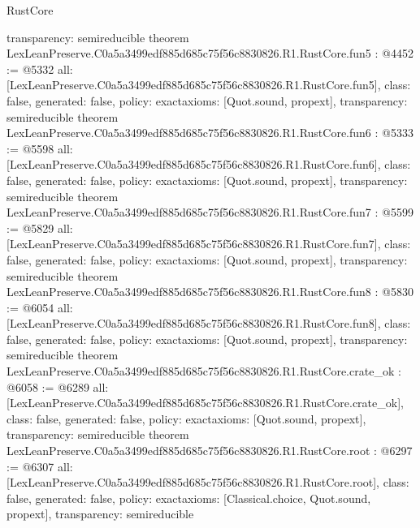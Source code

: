 \begin{lexlean}{RustCore}
\begin{coremodule}
{  transparency: semireducible
}
theorem LexLeanPreserve.C0a5a3499edf885d685c75f56c8830826.R1.RustCore.fun5 : @4452 := @5332 {
  all: [LexLeanPreserve.C0a5a3499edf885d685c75f56c8830826.R1.RustCore.fun5],
  class: false,
  generated: false,
  policy: exact{axioms: [Quot.sound, propext]},
  transparency: semireducible
}
theorem LexLeanPreserve.C0a5a3499edf885d685c75f56c8830826.R1.RustCore.fun6 : @5333 := @5598 {
  all: [LexLeanPreserve.C0a5a3499edf885d685c75f56c8830826.R1.RustCore.fun6],
  class: false,
  generated: false,
  policy: exact{axioms: [Quot.sound, propext]},
  transparency: semireducible
}
theorem LexLeanPreserve.C0a5a3499edf885d685c75f56c8830826.R1.RustCore.fun7 : @5599 := @5829 {
  all: [LexLeanPreserve.C0a5a3499edf885d685c75f56c8830826.R1.RustCore.fun7],
  class: false,
  generated: false,
  policy: exact{axioms: [Quot.sound, propext]},
  transparency: semireducible
}
theorem LexLeanPreserve.C0a5a3499edf885d685c75f56c8830826.R1.RustCore.fun8 : @5830 := @6054 {
  all: [LexLeanPreserve.C0a5a3499edf885d685c75f56c8830826.R1.RustCore.fun8],
  class: false,
  generated: false,
  policy: exact{axioms: [Quot.sound, propext]},
  transparency: semireducible
}
theorem LexLeanPreserve.C0a5a3499edf885d685c75f56c8830826.R1.RustCore.crate_ok : @6058 := @6289 {
  all: [LexLeanPreserve.C0a5a3499edf885d685c75f56c8830826.R1.RustCore.crate_ok],
  class: false,
  generated: false,
  policy: exact{axioms: [Quot.sound, propext]},
  transparency: semireducible
}
theorem LexLeanPreserve.C0a5a3499edf885d685c75f56c8830826.R1.RustCore.root : @6297 := @6307 {
  all: [LexLeanPreserve.C0a5a3499edf885d685c75f56c8830826.R1.RustCore.root],
  class: false,
  generated: false,
  policy: exact{axioms: [Classical.choice, Quot.sound, propext]},
  transparency: semireducible
}


\end{coremodule}
\end{lexlean}
